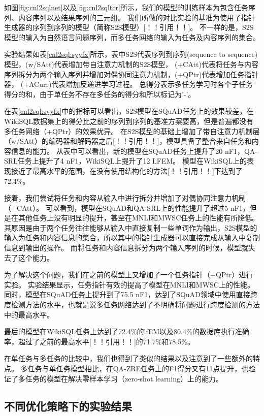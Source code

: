如图\ref{fig:cnl2sqlnet}以及\ref{fig:cnl2sqltcr}所示，我们的模型的训练样本为包含任务序列、内容序列以及结果序列的三元组。
我们所做的对比实验的基准为使用了指针生成器的序列到序列的模型（简称S2S模型）[！！引用！！]。
不一样的是，S2S模型的输入为自然语言问题序列，而多任务网络的输入为任务及内容序列的集合。

实验结果如表\ref{cnl2sql:syyfx}所示，表中S2S代表序列到序列(sequence to sequence)模型，(w/SAtt)代表增加带自注意力机制的S2S模型，
(+CAtt)代表将任务与内容序列拆分为两个输入序列并增加对偶协同注意力机制，(+QPtr)代表增加任务指针器， (+ACurr)代表增加反递进学习过程。
总得分表示多任务学习时各个子任务得分的和，由于单任务不存在多任务的得分和所以标记为’-’。


在表\ref{cnl2sql:syyfx}中的指标可以看出，S2S模型在SQuAD任务上的效果较差，在WikiSQL数据集上的得分比之前的序列到序列的基准方案要高，但是普遍都没有多任务网络（+QPtr）的效果优异。
在S2S模型的基础上增加了带自注意力机制层（w/SAtt）的编码器和解码器之后[！！引用！！]，模型具备了整合来自任务和内容信息的能力。
从表中可以看出，新的模型在SQuAD任务上提升了20 nF1，QA-SRL任务上提升了4 nF1，WikiSQL上提升了12 LFEM。
模型在WikiSQL上的表现接近了最高水平的范围，在没有使用结构化的方法[！！引用！！]下达到了72.4\%。

接着，我们尝试将任务和内容从输入中进行拆分并增加了对偶协同注意力机制（+CAtt）。
可以看到，模型在SQuAD和QA-SRL上的性能提升了超过5 nF1，但是在其他任务上没有明显的提升，甚至在MNLI和MWSC任务上的性能有所降低。
其原因是由于两个任务往往能够从输入中直接复制一些单词作为输出，S2S模型的输入为任务和内容信息的集合，所以其中的指针生成器可以直接完成从输入中复制信息到输出的操作。
而将任务和内容信息拆分为两个输入序列的时候，模型就失去了这个能力。

为了解决这个问题，我们在之前的模型上又增加了一个任务指针（+QPtr）进行实验。
实验结果显示，任务指针有效的提高了模型在MNLI和MWSC上的性能。
同时，模型在SQuAD任务上提升到了75.5 nF1，达到了SQuAD领域中使用直接跨度检测方法的水平，也就是说多任务网络达到了不明确将问题进行跨度检测的方法中的最高水平。

最后的模型在WikiSQL任务上达到了72.4\%的lfEM以及80.4\%的数据库执行准确率，超过了之前的最高水平[！！引用！！]的71.7\%和78.5\%。

在单任务与多任务的比较中，我们也得到了类似的结果以及注意到了一些额外的特点。
多任务与单任务模型相比，在QA-ZRE任务上的F1得分又有11点提升，也验证了多任务的模型在解决零样本学习（zero-shot learning）上的能力。

\subsection{不同优化策略下的实验结果}

